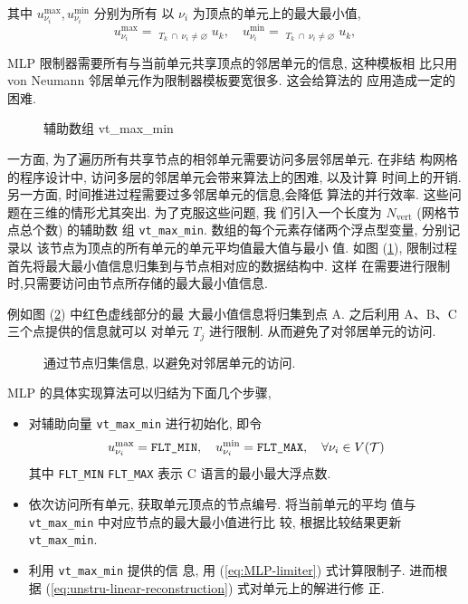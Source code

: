 其中 $u_{\nu_{i}}^{\max}, u_{\nu_{i}}^{\min}$ 分别为所有
以 $\nu_{i}$ 为顶点的单元上的最大最小值,
\begin{equation}
  \label{eq:uper-lower-bound-MLP}
  u_{\nu_{i}}^{\max} =
  \mathop{\min_{\forall T_{k} \in \mathcal{T}}}_{T_{k}~\cap ~\nu_{i}
    \ne \varnothing} u_{k},
  \quad
  u_{\nu_{i}}^{\min} =
  \mathop{\min_{\forall T_{k} \in \mathcal{T}}}_{T_{k}~\cap ~\nu_{i}
    \ne \varnothing} u_{k},
\end{equation}

MLP 限制器需要所有与当前单元共享顶点的邻居单元的信息, 这种模板相
比只用 von Neumann 邻居单元作为限制器模板要宽很多. 这会给算法的
应用造成一定的困难.

\begin{figure}[htbp]
  \centering
  
  \caption{辅助数组 vt\_max\_min}
  \label{fig:auxiliation-vector}
\end{figure}
一方面, 为了遍历所有共享节点的相邻单元需要访问多层邻居单元. 在非结
构网格的程序设计中, 访问多层的邻居单元会带来算法上的困难, 以及计算
时间上的开销. 另一方面, 时间推进过程需要过多邻居单元的信息,会降低
算法的并行效率. 这些问题在三维的情形尤其突出. 为了克服这些问题, 我
们引入一个长度为 $N_{\mbox{vert}}$ (网格节点总个数) 的辅助数
组 \verb|vt_max_min|. 数组的每个元素存储两个浮点型变量, 分别记录以
该节点为顶点的所有单元的单元平均值最大值与最小
值. 如图 (\ref{fig:auxiliation-vector}),
限制过程首先将最大最小值信息归集到与节点相对应的数据结构中. 这样
在需要进行限制时,只需要访问由节点所存储的最大最小值信息.

例如图 (\ref{fig:avoid-direct-visit-neighbour}) 中红色虚线部分的最
大最小值信息将归集到点 A.  之后利用 A、B、C 三个点提供的信息就可以
对单元 $T_{j}$ 进行限制. 从而避免了对邻居单元的访问.
\begin{figure}[htbp]
  \centering
  
  \caption{通过节点归集信息, 以避免对邻居单元的访问.}
  \label{fig:avoid-direct-visit-neighbour}
\end{figure}
MLP 的具体实现算法可以归结为下面几个步骤,
\begin{itemize}
\item 对辅助向量 \verb|vt_max_min| 进行初始化, 即令
  \[
  u_{\nu_{i}}^{\max} = \verb|FLT_MIN| , \quad u_{\nu_{i}}^{\min}
  = \verb|FLT_MAX|, \quad
  \forall \nu_{i} \in V(\mathcal{T})
  \]
  其中 \verb|FLT_MIN|  \verb|FLT_MAX| 表示 C 语言的最小最大浮点数.
\item 依次访问所有单元, 获取单元顶点的节点编号. 将当前单元的平均
  值与 \verb|vt_max_min| 中对应节点的最大最小值进行比
  较, 根据比较结果更新 \verb|vt_max_min|.
\item 利用 \verb|vt_max_min| 提供的信
  息, 用 (\ref{eq:MLP-limiter}) 式计算限制子. 进而根
  据 (\ref{eq:unstru-linear-reconstruction}) 式对单元上的解进行修
  正.
\end{itemize}
